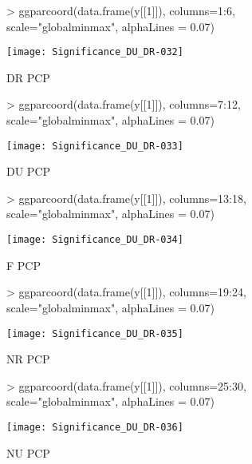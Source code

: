 \documentclass{article}
\begin{document}
\begin{figure}[H]
\centering
\begin{Schunk}
\begin{Sinput}
> ggparcoord(data.frame(y[[1]]), columns=1:6, scale="globalminmax", alphaLines = 0.07)
\end{Sinput}
\end{Schunk}
\texttt{[image: Significance\_DU\_DR-032]}
\caption{DR PCP}
\label{Boxd2q1s}
\end{figure}

\begin{figure}[H]
\centering
\begin{Schunk}
\begin{Sinput}
> ggparcoord(data.frame(y[[1]]), columns=7:12, scale="globalminmax", alphaLines = 0.07)
\end{Sinput}
\end{Schunk}
\texttt{[image: Significance\_DU\_DR-033]}
\caption{DU PCP}
\label{Boxd2q1s}
\end{figure}

\begin{figure}[H]
\centering
\begin{Schunk}
\begin{Sinput}
> ggparcoord(data.frame(y[[1]]), columns=13:18, scale="globalminmax", alphaLines = 0.07)
\end{Sinput}
\end{Schunk}
\texttt{[image: Significance\_DU\_DR-034]}
\caption{F PCP}
\label{Boxd2q1s}
\end{figure}

\begin{figure}[H]
\centering
\begin{Schunk}
\begin{Sinput}
> ggparcoord(data.frame(y[[1]]), columns=19:24, scale="globalminmax", alphaLines = 0.07)
\end{Sinput}
\end{Schunk}
\texttt{[image: Significance\_DU\_DR-035]}
\caption{NR PCP}
\label{Boxd2q1s}
\end{figure}

\begin{figure}[H]
\centering
\begin{Schunk}
\begin{Sinput}
> ggparcoord(data.frame(y[[1]]), columns=25:30, scale="globalminmax", alphaLines = 0.07)
\end{Sinput}
\end{Schunk}
\texttt{[image: Significance\_DU\_DR-036]}
\caption{NU PCP}
\label{Boxd2q1s}
\end{figure}
\end{document}
